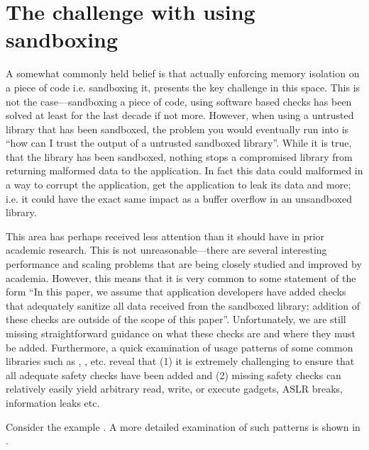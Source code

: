 \section{The challenge with using sandboxing}
%

A somewhat commonly held belief is that actually enforcing memory isolation on a piece of code 
i.e. sandboxing it, presents the key challenge in this space.
%
This is not the case---sandboxing a piece of code, using software based checks has been solved 
at least for the last decade if not more.
%
However, when using a untrusted library that has been sandboxed, the problem you would 
eventually run into is ``how can I trust the output of a untrusted sandboxed library''.
%
While it is true, that the library has been sandboxed, nothing stops a compromised library from 
returning malformed data to the application.
%
In fact this data could malformed in a way to corrupt the application, get the application to 
leak its data and more; i.e. it could have the exact same impact as a buffer overflow in an 
unsandboxed library.

This area has perhaps received less attention than it should have in prior academic research.
%
This is not unreasonable---there are several interesting performance and scaling problems that 
are being closely studied and improved by academia.
%
However, this means that it is very common to some statement of the form ``In this paper, we 
assume that application developers have added checks that adequately sanitize all data received 
from the sandboxed library; addition of these checks are outside of the scope of this paper''. 
%
Unfortunately, we are still missing straightforward guidance on what these checks are and where 
they must be added.
%
Furthermore, a quick examination of usage patterns of some common libraries such as \jpeg, 
\png, \vorbis etc. reveal that (1) it is extremely challenging to ensure that all adequate 
safety checks have been added and (2) missing safety checks can relatively easily yield 
arbitrary read, write, or execute gadgets, ASLR breaks, information leaks etc.

Consider the example \todo{}.
%
A more detailed examination of such patterns is shown in .
